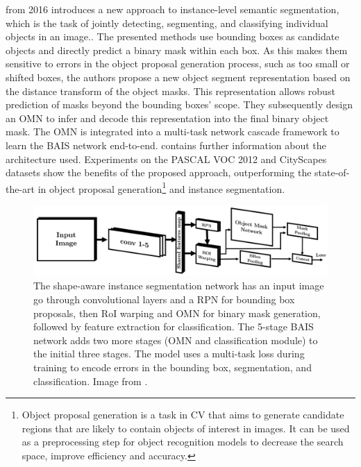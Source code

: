  \cite{DBLP:journals/corr/HayderHS16} from 2016 introduces a new approach to instance-level semantic segmentation, which is the task of jointly detecting, segmenting, and classifying individual objects in an image.\cite{hafiz2020survey}\cite{bolya2019yolact}. The presented methods use bounding boxes as candidate objects and directly predict a binary mask within each box. As this makes them sensitive to errors in the object proposal generation process, such as too small or shifted boxes, the authors propose a new object segment representation based on the distance transform of the object masks. This representation allows robust prediction of masks beyond the bounding boxes' scope. They subsequently design an \acf{OMN} to infer and decode this representation into the final binary object mask. The \ac{OMN} is integrated into a multi-task network cascade framework to learn the \acf{BAIS} network end-to-end.  contains further information about the architecture used. Experiments on the PASCAL VOC 2012 \cite{pascal-voc-2012} and CityScapes \cite{cordts2016cityscapes} datasets show the benefits of the proposed approach, outperforming the state-of-the-art in object proposal generation\footnote{Object proposal generation is a task in \ac{CV} that aims to generate candidate regions that are likely to contain objects of interest in images. It can be used as a preprocessing step for object recognition models to decrease the search space, improve efficiency and accuracy.\cite{https://doi.org/10.48550/arxiv.2201.06696}\cite{https://doi.org/10.48550/arxiv.2008.05700}\cite{objectProposalGeneration2021}} and instance segmentation.

\begin{figure}[H]%
    \centering
    \includegraphics[width=\imgWidthXL]{images/boundary_aware_instance_segmentation.png}
    \caption[Shape-aware instance segmentation network]{The shape-aware instance segmentation network has an input image go through convolutional layers and a \ac{RPN}\cite{NIPS2015_14bfa6bb} for bounding box proposals, then \ac{RoI} warping and \ac{OMN} for binary mask generation, followed by feature extraction for classification. The 5-stage \acf{BAIS} network adds two more stages (OMN and classification module) to the initial three stages. The model uses a multi-task loss during training to encode errors in the bounding box, segmentation, and classification. Image from \cite{NIPS2015_14bfa6bb}.}
    \label{boundary_aware_instance_segmentation}
\end{figure}

